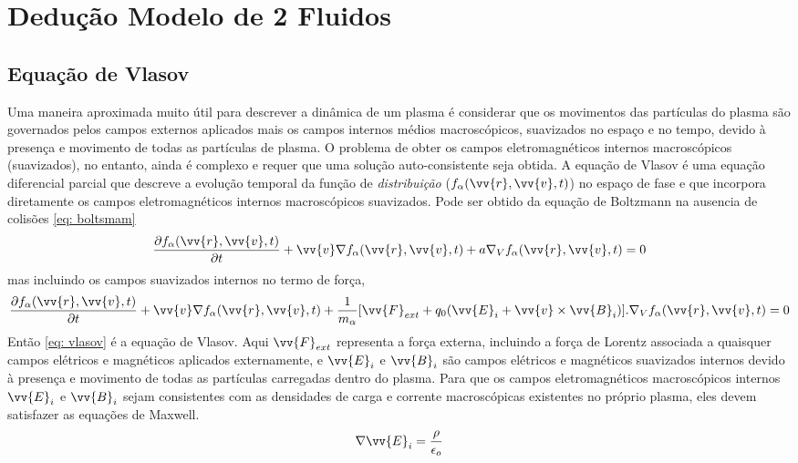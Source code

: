 \documentclass[12pt,oneside,a4paper]{abntex2}
\theoremstyle{definition}  %
\begin{document}
\chapter{Dedução Modelo de 2 Fluidos}
\section{Equação de Vlasov}
Uma maneira aproximada muito útil para descrever a dinâmica de um plasma é considerar que os movimentos das partículas do plasma são governados pelos campos externos aplicados mais os campos internos médios macroscópicos, suavizados no espaço e no tempo, devido à presença e movimento de todas as partículas de plasma. O problema de obter os campos eletromagnéticos internos macroscópicos (suavizados), no entanto, ainda é complexo e requer que uma solução auto-consistente seja obtida.
A equação de Vlasov é uma equação diferencial parcial que descreve a evolução temporal da função de \textit{distribuição} ($f_\alpha(\vv{r},\vv{v},t)$) no espaço de fase e que incorpora diretamente os campos eletromagnéticos internos macroscópicos suavizados. Pode ser obtido da equação de Boltzmann na ausencia de colisões \ref{eq: boltsmam}
\begin{equation}
\label{eq: boltsmam}
\frac{\partial f_\alpha(\vv{r},\vv{v},t)}{\partial t} +\vv{v} \nabla f_\alpha(\vv{r},\vv{v},t) + a \nabla_V f_\alpha(\vv{r},\vv{v},t) = 0
\end{equation}  
mas incluindo os campos suavizados internos no termo de força,
\begin{equation}
\label{eq: vlasov}
\frac{\partial f_\alpha(\vv{r},\vv{v},t)}{\partial t} +\vv{v} \nabla f_\alpha(\vv{r},\vv{v},t) + \frac{1}{m_\alpha}[\vv{F}_{ext}+q_0(\vv{E}_i+\vv{v} \times \vv{B}_i)] . \nabla_V f_\alpha(\vv{r},\vv{v},t)= 0
\end{equation}
Então \ref{eq: vlasov} é a equação de Vlasov.
Aqui $\vv{F}_{ext}$ representa a força externa, incluindo a força de Lorentz associada a quaisquer campos elétricos e magnéticos aplicados externamente, e $\vv{E}_i$ e $\vv{B}_i$ são campos elétricos e magnéticos suavizados internos devido à presença e movimento de todas as partículas carregadas dentro do plasma. Para que os campos eletromagnéticos macroscópicos internos $\vv{E}_i$ e $\vv{B}_i$ sejam consistentes com as densidades de carga e corrente macroscópicas existentes no próprio plasma, eles devem satisfazer as equações de Maxwell.
\begin{equation}
\nabla \vv{E}_i = \frac{\rho}{\epsilon_o}
\end{equation}
\end{document}
